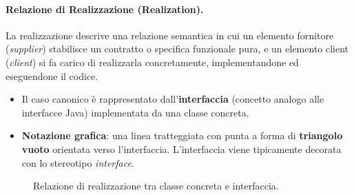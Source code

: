 \documentclass[12pt]{extarticle}
\newcommand{\cn}[1]{\makebox[\linewidth][c]{\textbf{#1}}}
\begin{document}
\paragraph{Relazione di Realizzazione (Realization).}
La realizzazione descrive una relazione semantica in cui un elemento fornitore (\textit{supplier}) stabilisce un contratto o specifica funzionale pura, e un elemento client (\textit{client}) si fa carico di realizzarla concretamente, implementandone ed eseguendone il codice.
\begin{itemize}
    \item Il caso canonico è rappresentato dall'\textbf{interfaccia} (concetto analogo alle interfacce Java) implementata da una classe concreta.
    \item \textbf{Notazione grafica}: una linea tratteggiata con punta a forma di \textbf{triangolo vuoto} orientata verso l'interfaccia. L'interfaccia viene tipicamente decorata con lo stereotipo \guillemotleft\textit{interface}\guillemotright.
\end{itemize}

\begin{figure}[H]
    \centering
{}
    \caption{Relazione di realizzazione tra classe concreta e interfaccia.}
    \label{fig:uml_realization}
\end{figure}
\end{document}
